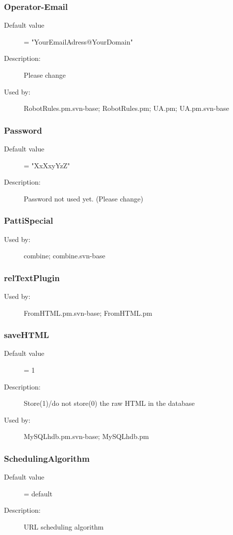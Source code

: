 \subsubsection{Operator-Email}
\label{Operator-Email}
\begin{description}
\item[Default value] = "YourEmailAdress@YourDomain"
\item[Description:] Please change
\item[Used by:] RobotRules.pm.svn-base; RobotRules.pm; UA.pm; UA.pm.svn-base
\end{description}
\subsubsection{Password}
\label{Password}
\begin{description}
\item[Default value] = "XxXxyYzZ"
\item[Description:] Password not used yet. (Please change)
\end{description}
\subsubsection{PattiSpecial}
\label{PattiSpecial}
\begin{description}
\item[Used by:] combine; combine.svn-base
\end{description}
\subsubsection{relTextPlugin}
\label{relTextPlugin}
\begin{description}
\item[Used by:] FromHTML.pm.svn-base; FromHTML.pm
\end{description}
\subsubsection{saveHTML}
\label{saveHTML}
\begin{description}
\item[Default value] = 1
\item[Description:] Store(1)/do not store(0) the raw HTML in the database
\item[Used by:] MySQLhdb.pm.svn-base; MySQLhdb.pm
\end{description}
\subsubsection{SchedulingAlgorithm}
\label{SchedulingAlgorithm}
\begin{description}
\item[Default value] = default
\item[Description:] URL scheduling algorithm
\end{description}
